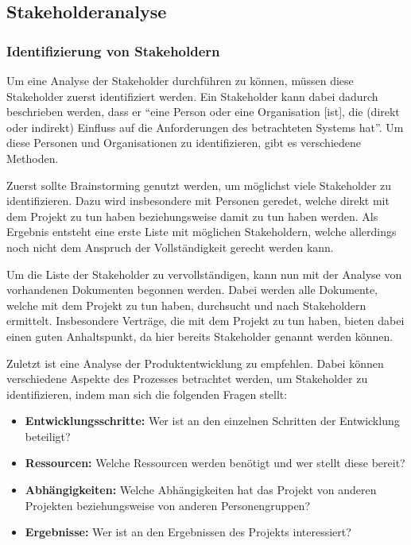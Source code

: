 \subsection{Stakeholderanalyse}\label{sec:stakeholderanalyse-teil-1}
\subsubsection{Identifizierung von Stakeholdern}
Um eine Analyse der Stakeholder durchführen zu können, müssen diese Stakeholder zuerst identifiziert werden.
Ein Stakeholder kann dabei dadurch beschrieben werden, dass er ``eine Person oder eine Organisation [ist], die (direkt oder indirekt) Einfluss auf die Anforderungen des betrachteten Systems hat''\autocite[Seite 8]{Maulhardt.a}.
Um diese Personen und Organisationen zu identifizieren, gibt es verschiedene Methoden.

Zuerst sollte Brainstorming genutzt werden, um möglichst viele Stakeholder zu identifizieren.
Dazu wird insbesondere mit Personen geredet, welche direkt mit dem Projekt zu tun haben beziehungsweise damit zu tun haben werden.
Als Ergebnis entsteht eine erste Liste mit möglichen Stakeholdern, welche allerdings noch nicht dem Anspruch der Vollständigkeit gerecht werden kann.

Um die Liste der Stakeholder zu vervollständigen, kann nun mit der Analyse von vorhandenen Dokumenten begonnen werden.
Dabei werden alle Dokumente, welche mit dem Projekt zu tun haben, durchsucht und nach Stakeholdern ermittelt.
Insbesondere Verträge, die mit dem Projekt zu tun haben, bieten dabei einen guten Anhaltspunkt, da hier bereits Stakeholder genannt werden können.

Zuletzt ist eine Analyse der Produktentwicklung zu empfehlen.
Dabei können verschiedene Aspekte des Prozesses betrachtet werden, um Stakeholder zu identifizieren, indem man sich die folgenden Fragen stellt:

\begin{itemize}
    \item \textbf{Entwicklungsschritte:} Wer ist an den einzelnen Schritten der Entwicklung beteiligt?
    \item \textbf{Ressourcen:} Welche Ressourcen werden benötigt und wer stellt diese bereit?
    \item \textbf{Abhängigkeiten:} Welche Abhängigkeiten hat das Projekt von anderen Projekten beziehungsweise von anderen Personengruppen?
    \item \textbf{Ergebnisse:} Wer ist an den Ergebnissen des Projekts interessiert?
\end{itemize}

